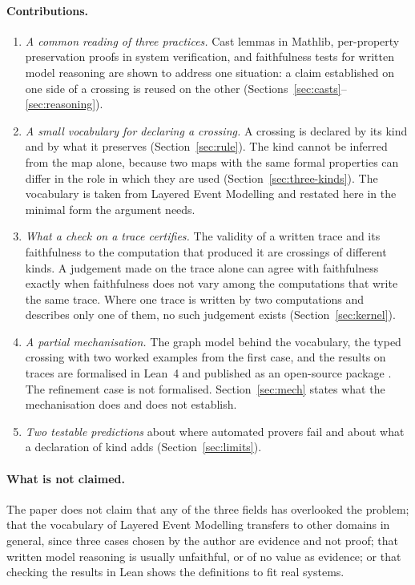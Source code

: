 \paragraph{Contributions.}
\begin{enumerate}[label=(\arabic*)]
  \item \emph{A common reading of three practices.} Cast lemmas in Mathlib, per-property
        preservation proofs in system verification, and faithfulness tests for written
        model reasoning are shown to address one situation: a claim established on one
        side of a crossing is reused on the other
        (Sections~\ref{sec:casts}--\ref{sec:reasoning}).
  \item \emph{A small vocabulary for declaring a crossing.} A crossing is declared by its
        kind and by what it preserves (Section~\ref{sec:rule}). The kind cannot be
        inferred from the map alone, because two maps with the same formal properties can
        differ in the role in which they are used (Section~\ref{sec:three-kinds}). The
        vocabulary is taken from Layered Event Modelling \citep{kreinzlem} and restated
        here in the minimal form the argument needs.
  \item \emph{What a check on a trace certifies.} The validity of a written trace and its
        faithfulness to the computation that produced it are crossings of different
        kinds. A judgement made on the trace alone can agree with faithfulness exactly
        when faithfulness does not vary among the computations that write the same
        trace. Where one trace is written by two computations and describes only one of
        them, no such judgement exists (Section~\ref{sec:kernel}).
  \item \emph{A partial mechanisation.} The graph model behind the vocabulary, the
        typed crossing with two worked examples from the first case, and the results on
        traces are formalised in Lean~4 and published as an open-source package
        \citep{kreinzlemlean}. The refinement case is not formalised.
        Section~\ref{sec:mech} states what the mechanisation does and does not
        establish.
  \item \emph{Two testable predictions} about where automated provers fail and about
        what a declaration of kind adds
        (Section~\ref{sec:limits}).
\end{enumerate}

\paragraph{What is not claimed.} The paper does not claim that any of the three fields
has overlooked the problem; that the vocabulary of Layered Event Modelling transfers to
other domains in general, since three cases chosen by the author are evidence and not
proof; that written model reasoning is usually unfaithful, or of no value as evidence; or
that checking the results in Lean shows the definitions to fit real systems.

